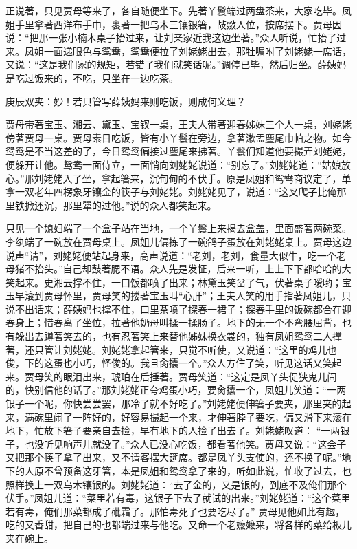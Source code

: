 \begin{parag}
    正说著，只见贾母等来了，各自随便坐下。先著丫鬟端过两盘茶来，大家吃毕。凤姐手里拿著西洋布手巾，裹著一把乌木三镶银箸，敁敠人位，按席摆下。贾母因说：“把那一张小楠木桌子抬过来，让刘亲家近我这边坐著。”众人听说，忙抬了过来。凤姐一面递眼色与鸳鸯，鸳鸯便拉了刘姥姥出去，那牡嘱咐了刘姥姥一席话，又说：“这是我们家的规矩，若错了我们就笑话呢。”调停已毕，然后归坐。薛姨妈是吃过饭来的，不吃，只坐在一边吃茶。\begin{note}庚辰双夹：妙！若只管写薛姨妈来则吃饭，则成何义理？\end{note}贾母带著宝玉、湘云、黛玉、宝钗一桌，王夫人带著迎春姊妹三个人一桌，刘姥姥傍著贾母一桌。贾母素日吃饭，皆有小丫鬟在旁边，拿著漱盂麈尾巾帕之物。如今鸳鸯是不当这差的了，今日鸳鸯偏接过麈尾来拂著。丫鬟们知道他要撮弄刘姥姥，便躲开让他。鸳鸯一面侍立，一面悄向刘姥姥说道：“别忘了。”刘姥姥道：“姑娘放心。”那刘姥姥入了坐，拿起箸来，沉甸甸的不伏手。原是凤姐和鸳鸯商议定了，单拿一双老年四楞象牙镶金的筷子与刘姥姥。刘姥姥见了，说道：“这叉爬子比俺那里铁掀还沉，那里犟的过他。”说的众人都笑起来。
\end{parag}


\begin{parag}
    只见一个媳妇端了一个盒子站在当地，一个丫鬟上来揭去盒盖，里面盛著两碗菜。李纨端了一碗放在贾母桌上。凤姐儿偏拣了一碗鸽子蛋放在刘姥姥桌上。贾母这边说声“请”，刘姥姥便站起身来，高声说道：“老刘，老刘，食量大似牛，吃一个老母猪不抬头。”自己却鼓著腮不语。众人先是发怔，后来一听，上上下下都哈哈的大笑起来。史湘云撑不住，一口饭都喷了出来；林黛玉笑岔了气，伏著桌子嗳哟；宝玉早滚到贾母怀里，贾母笑的搂著宝玉叫“心肝”；王夫人笑的用手指著凤姐儿，只说不出话来；薛姨妈也撑不住，口里茶喷了探春一裙子；探春手里的饭碗都合在迎春身上；惜春离了坐位，拉著他奶母叫揉一揉肠子。地下的无一个不弯腰屈背，也有躲出去蹲著笑去的，也有忍著笑上来替他姊妹换衣裳的，独有凤姐鸳鸯二人撑著，还只管让刘姥姥。刘姥姥拿起箸来，只觉不听使，又说道：“这里的鸡儿也俊，下的这蛋也小巧，怪俊的。我且肏攮一个。”众人方住了笑，听见这话又笑起来。贾母笑的眼泪出来，琥珀在后捶著。贾母笑道：“这定是凤丫头促狭鬼儿闹的，快别信他的话了。”那刘姥姥正夸鸡蛋小巧，要肏攮一个，凤姐儿笑道：“一两银子一个呢，你快尝尝罢，那冷了就不好吃了。”刘姥姥便伸箸子要夹，那里夹的起来，满碗里闹了一阵好的，好容易撮起一个来，才伸著脖子要吃，偏又滑下来滚在地下，忙放下箸子要亲自去捡，早有地下的人捡了出去了。刘姥姥叹道： “一两银子，也没听见响声儿就没了。”众人已没心吃饭，都看著他笑。贾母又说：“这会子又把那个筷子拿了出来，又不请客摆大筵席。都是凤丫头支使的，还不换了呢。”地下的人原不曾预备这牙箸，本是凤姐和鸳鸯拿了来的，听如此说，忙收了过去，也照样换上一双乌木镶银的。刘姥姥道：“去了金的，又是银的，到底不及俺们那个伏手。”凤姐儿道：“菜里若有毒，这银子下去了就试的出来。”刘姥姥道：“这个菜里若有毒，俺们那菜都成了砒霜了。那怕毒死了也要吃尽了。” 贾母见他如此有趣，吃的又香甜，把自己的也都端过来与他吃。又命一个老嬷嬷来，将各样的菜给板儿夹在碗上。
\end{parag}



